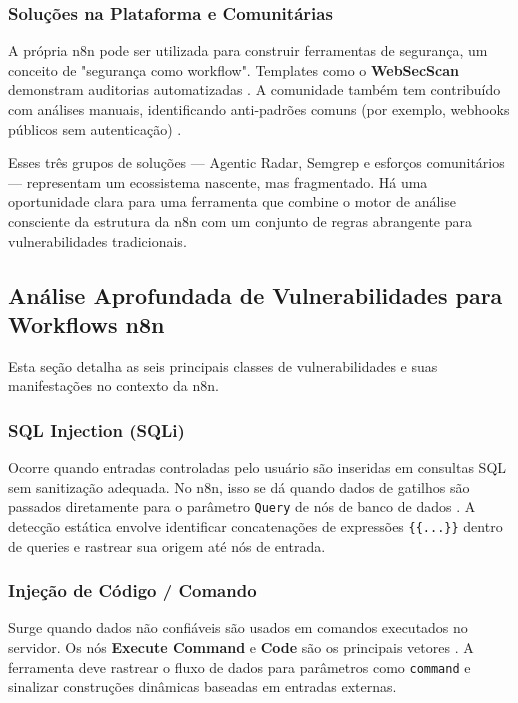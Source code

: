 \documentclass{sftex}
\begin{document}
\subsubsection{Soluções na Plataforma e Comunitárias}

A própria n8n pode ser utilizada para construir ferramentas de segurança, um conceito de "segurança como workflow". Templates como o \textbf{WebSecScan} demonstram auditorias automatizadas \cite{websecscan_workflow}. A comunidade também tem contribuído com análises manuais, identificando anti-padrões comuns (por exemplo, webhooks públicos sem autenticação) \cite{n8n_best_practices_reddit}.

Esses três grupos de soluções — Agentic Radar, Semgrep e esforços comunitários — representam um ecossistema nascente, mas fragmentado. Há uma oportunidade clara para uma ferramenta que combine o motor de análise consciente da estrutura da n8n com um conjunto de regras abrangente para vulnerabilidades tradicionais.

\subsection{Análise Aprofundada de Vulnerabilidades para Workflows n8n}

Esta seção detalha as seis principais classes de vulnerabilidades e suas manifestações no contexto da n8n.

\subsubsection{SQL Injection (SQLi)}

Ocorre quando entradas controladas pelo usuário são inseridas em consultas SQL sem sanitização adequada. No n8n, isso se dá quando dados de gatilhos são passados diretamente para o parâmetro \texttt{Query} de nós de banco de dados \cite{n8n_mysql_escaping}. A detecção estática envolve identificar concatenações de expressões \texttt{\{\{...\}\}} dentro de queries e rastrear sua origem até nós de entrada.

\subsubsection{Injeção de Código / Comando}

Surge quando dados não confiáveis são usados em comandos executados no servidor. Os nós \textbf{Execute Command} e \textbf{Code} são os principais vetores \cite{n8n_code}. A ferramenta deve rastrear o fluxo de dados para parâmetros como \texttt{command} e sinalizar construções dinâmicas baseadas em entradas externas.
\end{document}
